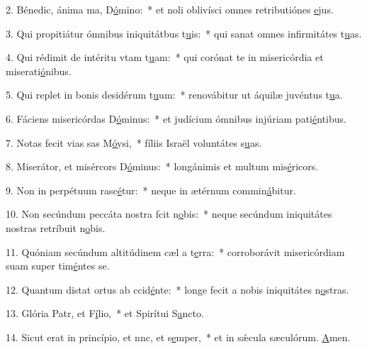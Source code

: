 2. Bénedic, ánima ma, D\uline{ó}mino:~* et noli oblivísci omnes retributiónes \uline{e}jus.\par 
3. Qui propitiátur ómnibus iniquitátbus t\uline{u}is:~* qui sanat omnes infirmitátes t\uline{u}as.\par 
4. Qui rédimit de intéritu vtam t\uline{u}am:~* qui corónat te in misericórdia et miserati\uline{ó}nibus.\par 
5. Qui replet in bonis desidérum t\uline{u}um:~* renovábitur ut áquilæ juvéntus t\uline{u}a.\par 
6. Fáciens misericórdas D\uline{ó}minus:~* et judícium ómnibus injúriam pati\uline{é}ntibus.\par 
7. Notas fecit vias sas M\uline{ó}ysi,~* fíliis Israël voluntátes s\uline{u}as.\par 
8. Miserátor, et misércors D\uline{ó}minus:~* longánimis et multum mis\uline{é}ricors.\par 
9. Non in perpétuum rasc\uline{é}tur:~* neque in ætérnum commin\uline{á}bitur.\par 
10. Non secúndum peccáta nostra fcit n\uline{o}bis:~* neque secúndum iniquitátes nostras retríbuit n\uline{o}bis.\par 
11. Quóniam secúndum altitúdinem cæl a t\uline{e}rra:~* corroborávit misericórdiam suam super tim\uline{é}ntes se.\par 
12. Quantum distat ortus ab ccid\uline{é}nte:~* longe fecit a nobis iniquitátes n\uline{o}stras.\par 
13. Glória Patr, et F\uline{í}lio,~* et Spirítui S\uline{a}ncto.\par 
14. Sicut erat in princípio, et nnc, et s\uline{e}mper,~* et in sǽcula sæculórum. \uline{A}men.\par 
